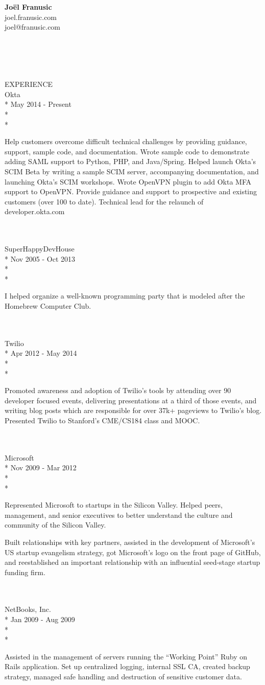 \documentclass[10pt]{article}
\newcommand{\work}[5]{
#1\\*
#2\\*
\\*
\makebox[1in][l]{}
\begin{minipage}[t]{5.50in}\small{#5}\end{minipage}
\\
\\
}
\newcommand{\heading}[1]{
#1
\\
}
\newcommand{\address}[1]{
\hfill{}\begin{minipage}[t]{2.00in}#1\end{minipage}
\\
}
\begin{document}
\address{\textbf{Jo\"el Franusic}\\ joel.franusic.com\\ joel@franusic.com}
\\
\\
\\
\heading{EXPERIENCE}

\work{Okta}{May 2014 - Present}{San Francisco, California}{Senior Developer Evangelist}{
  Help customers overcome difficult technical challenges by providing
  guidance, support, sample code, and documentation.  Wrote sample code
  to demonstrate adding SAML support to Python, PHP, and Java/Spring. Helped
  launch Okta's SCIM Beta by writing a sample SCIM server,
  accompanying documentation, and launching Okta's SCIM
  workshops. Wrote OpenVPN plugin to add Okta MFA support to
  OpenVPN. Provide guidance and support to prospective and
  existing customers (over 100 to date). Technical lead for the relaunch of
  developer.okta.com
}

\work{SuperHappyDevHouse}{Nov 2005 - Oct 2013}{Bay Area, California}{Co-organizer}{
I helped organize a well-known programming party that is modeled after the Homebrew Computer Club.
}

\work{Twilio}{Apr 2012 - May 2014}{San Francisco, California}{Developer Evangelist}{
Promoted awareness and adoption of Twilio’s tools by attending over 90
developer focused events, delivering presentations at a third of those
events, and writing blog posts which are responsible for over 37k+
pageviews to Twilio’s blog.  Presented Twilio to Stanford’s CME/CS184
class and MOOC.
}

\work{Microsoft}{Nov 2009 - Mar 2012}{Silicon Valley, California}{Startup Developer Evangelist}{

Represented Microsoft to startups in the Silicon Valley.
Helped peers, management, and senior executives to better understand the culture and community of the Silicon Valley.

Built relationships with key partners, 
assisted in the development of Microsoft's US startup evangelism strategy, 
got Microsoft's logo on the front page of GitHub, 
and reestablished an important relationship with an influential seed-stage startup funding firm.
}

\work{NetBooks, Inc.}{Jan 2009 - Aug 2009}{San Francisco, California}{System Administrator}{
Assisted in the management of servers running the ``Working Point''
Ruby on Rails application.  Set up centralized logging, internal SSL
CA, created backup strategy, managed safe handling and destruction of
sensitive customer data.
}
\end{document}
